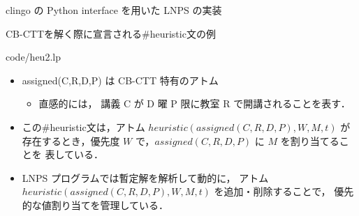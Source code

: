 \documentclass[11pt,dvipdfmx]{beamer}
\begin{document}
\begin{frame}{clingo の Python interface を用いた LNPS の実装}
\begin{exampleblock}{CB-CTTを解く際に宣言される\#heuristic文の例}

{code/heu2.lp}

\begin{itemize}
 \item \small assigned(C,R,D,P) は CB-CTT 特有のアトム
  \begin{itemize}
   \item 直感的には，
   講義 C が D 曜 P 限に教室 R で開講されることを表す．
  \end{itemize}
 \end{itemize}
\end{exampleblock}
\bigskip
\begin{block}{}
\begin{itemize}
\item \small この\#heuristic文は，アトム $heuristic(assigned(C,R,D,P),W,M,t)$ が
存在するとき，優先度 $W$ で，$assigned(C,R,D,P)$ に $M$ を割り当てることを
表している．
\item \small LNPS プログラムでは暫定解を解析して動的に，
アトム $heuristic(assigned(C,R,D,P),W,M,t)$ を追加・削除することで，
優先的な値割り当てを管理している．
\end{itemize}
\end{block}
\end{frame}
\end{document}
